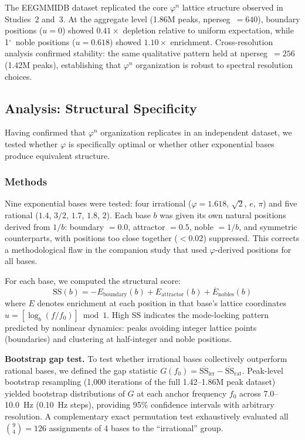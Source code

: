 \documentclass[11pt,a4paper]{article}
\newcommand{\degree}{$^\circ$}  %
\newcommand{\phisym}{\varphi}
\begin{document}
The EEGMMIDB dataset replicated the core $\phisym^n$ lattice structure observed in Studies~2 and~3. At the aggregate level (1.86M peaks, nperseg~$= 640$), boundary positions ($u = 0$) showed $0.41\times$ depletion relative to uniform expectation, while 1\degree\ noble positions ($u = 0.618$) showed $1.10\times$ enrichment. Cross-resolution analysis confirmed stability: the same qualitative pattern held at nperseg~$= 256$ (1.42M peaks), establishing that $\phisym^n$ organization is robust to spectral resolution choices.

\subsection{Analysis: Structural Specificity}
\label{sec:study4_specificity}

Having confirmed that $\phisym^n$ organization replicates in an independent dataset, we tested whether $\phisym$ is specifically optimal or whether other exponential bases produce equivalent structure.

\subsubsection{Methods}
\label{sec:study4_specificity_methods}

Nine exponential bases were tested: four irrational ($\phisym = 1.618$, $\sqrt{2}$, $e$, $\pi$) and five rational ($1.4$, $3/2$, $1.7$, $1.8$, $2$). Each base $b$ was given its own natural positions derived from $1/b$: boundary $= 0.0$, attractor $= 0.5$, noble $= 1/b$, and symmetric counterparts, with positions too close together ($<0.02$) suppressed. This corrects a methodological flaw in the companion study that used $\phisym$-derived positions for all bases.

For each base, we computed the structural score:
\begin{equation}
\text{SS}(b) = -E_{\text{boundary}}(b) + E_{\text{attractor}}(b) + \overline{E}_{\text{nobles}}(b)
\label{eq:structural_score}
\end{equation}
where $E$ denotes enrichment at each position in that base's lattice coordinates $u = [\log_b(f/f_0)] \bmod 1$. High SS indicates the mode-locking pattern predicted by nonlinear dynamics: peaks avoiding integer lattice points (boundaries) and clustering at half-integer and noble positions.

\textbf{Bootstrap gap test.} To test whether irrational bases collectively outperform rational bases, we defined the gap statistic $G(f_0) = \overline{\text{SS}}_{\text{irr}} - \overline{\text{SS}}_{\text{rat}}$. Peak-level bootstrap resampling (1,000 iterations of the full 1.42--1.86M peak dataset) yielded bootstrap distributions of $G$ at each anchor frequency $f_0$ across 7.0--10.0~Hz (0.10~Hz steps), providing 95\% confidence intervals with arbitrary resolution. A complementary exact permutation test exhaustively evaluated all $\binom{9}{4} = 126$ assignments of 4 bases to the ``irrational'' group.
\end{document}
